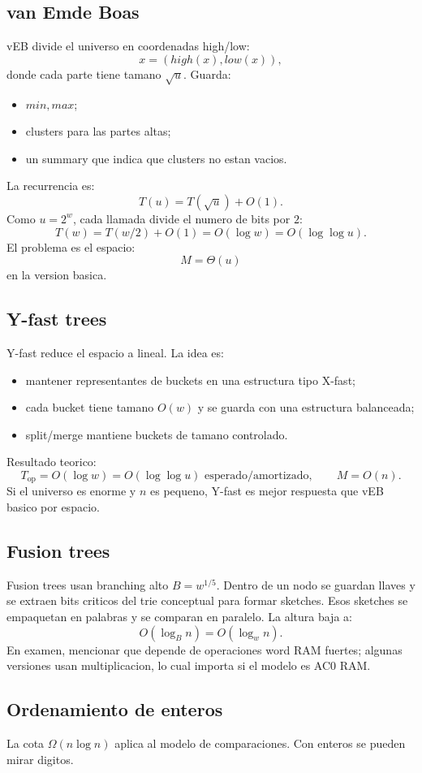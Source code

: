 \documentclass[10pt]{article}
\newcommand{\bigO}{O}
\begin{document}
\subsection{van Emde Boas}
vEB divide el universo en coordenadas high/low:
\[
x=(high(x),low(x)),
\]
donde cada parte tiene tamano \(\sqrt u\). Guarda:
\begin{itemize}
\item \(min,max\);
\item clusters para las partes altas;
\item un summary que indica que clusters no estan vacios.
\end{itemize}
La recurrencia es:
\[
T(u)=T(\sqrt u)+\bigO(1).
\]
Como \(u=2^w\), cada llamada divide el numero de bits por \(2\):
\[
T(w)=T(w/2)+\bigO(1)=\bigO(\log w)=\bigO(\log\log u).
\]
El problema es el espacio:
\[
M=\Theta(u)
\]
en la version basica.

\subsection{Y-fast trees}
Y-fast reduce el espacio a lineal. La idea es:
\begin{itemize}
\item mantener representantes de buckets en una estructura tipo X-fast;
\item cada bucket tiene tamano \(\bigO(w)\) y se guarda con una estructura balanceada;
\item split/merge mantiene buckets de tamano controlado.
\end{itemize}
Resultado teorico:
\[
T_{\text{op}}=\bigO(\log w)=\bigO(\log\log u) \text{ esperado/amortizado},\qquad M=\bigO(n).
\]
Si el universo es enorme y \(n\) es pequeno, Y-fast es mejor respuesta que vEB basico por espacio.

\subsection{Fusion trees}
Fusion trees usan branching alto \(B=w^{1/5}\). Dentro de un nodo se guardan llaves y se extraen bits criticos
del trie conceptual para formar sketches. Esos sketches se empaquetan en palabras y se comparan en paralelo.
La altura baja a:
\[
\bigO(\log_B n)=\bigO(\log_w n).
\]
En examen, mencionar que depende de operaciones word RAM fuertes; algunas versiones usan multiplicacion, lo
cual importa si el modelo es AC0 RAM.

\subsection{Ordenamiento de enteros}
La cota \(\Omega(n\log n)\) aplica al modelo de comparaciones. Con enteros se pueden mirar digitos.
\end{document}
